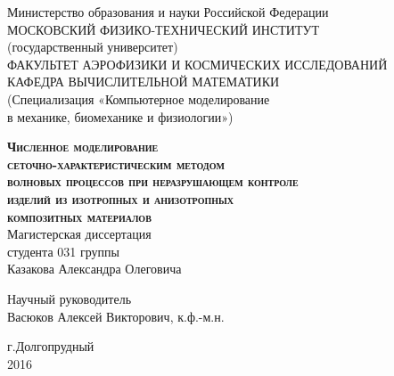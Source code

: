 \begin{titlepage}
\newpage

\begin{center}
	Министерство образования и науки Российской Федерации \\
	МОСКОВСКИЙ ФИЗИКО-ТЕХНИЧЕСКИЙ ИНСТИТУТ\\(государственный университет)\\[0.5cm]
	ФАКУЛЬТЕТ АЭРОФИЗИКИ И КОСМИЧЕСКИХ ИССЛЕДОВАНИЙ\\
	КАФЕДРА ВЫЧИСЛИТЕЛЬНОЙ МАТЕМАТИКИ\\
	(Специализация «Компьютерное моделирование\\
	в механике, биомеханике и физиологии»)\\[1cm]
\end{center}

\vspace{1em}

\begin{center}
	\textsc{\textbf{Численное моделирование\\
	 сеточно-характеристическим методом\\
	 волновых процессов при неразрушающем контроле\\
	 изделий из изотропных и анизотропных\\
	 композитных материалов}}\\[2cm]
	Магистерская диссертация\\[0.5cm]
	студента 031 группы\\
	Казакова Александра Олеговича\\
\end{center}

\vspace{1.5em}

\begin{center}
	Научный руководитель\\
	Васюков Алексей Викторович, к.ф.-м.н.
\end{center}

\vfill

\begin{center}
	г.Долгопрудный\\
	2016
\end{center}


\end{titlepage}
